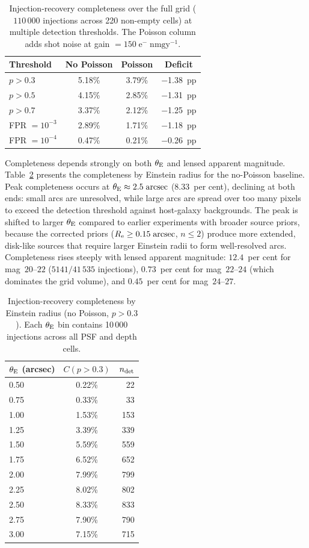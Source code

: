 \documentclass[fleqn,usenatbib]{mnras}
\begin{document}
\begin{table}
\caption{Injection-recovery completeness over the full grid ($110\,000$ injections across 220 non-empty cells) at multiple detection thresholds.  The Poisson column adds shot noise at gain $= 150\;\mathrm{e^{-}\;nmgy^{-1}}$.}
\label{tab:thresholds}
\centering
\begin{tabular}{lccc}
\toprule
Threshold & No Poisson & Poisson & Deficit \\
\midrule
$p > 0.3$ & 5.18\% & 3.79\% & $-$1.38~pp \\
$p > 0.5$ & 4.15\% & 2.85\% & $-$1.31~pp \\
$p > 0.7$ & 3.37\% & 2.12\% & $-$1.25~pp \\
FPR $= 10^{-3}$ & 2.89\% & 1.71\% & $-$1.18~pp \\
FPR $= 10^{-4}$ & 0.47\% & 0.21\% & $-$0.26~pp \\
\bottomrule
\end{tabular}
\end{table}

Completeness depends strongly on both $\theta_{\rm E}$ and lensed apparent magnitude.  Table~\ref{tab:thetaE} presents the completeness by Einstein radius for the no-Poisson baseline.  Peak completeness occurs at $\theta_{\rm E} \approx 2.5\;\mathrm{arcsec}$ ($8.33$~per cent), declining at both ends: small arcs are unresolved, while large arcs are spread over too many pixels to exceed the detection threshold against host-galaxy backgrounds.  The peak is shifted to larger $\theta_{\rm E}$ compared to earlier experiments with broader source priors, because the corrected priors ($R_{\rm e} \geq 0.15\;\mathrm{arcsec}$, $n \leq 2$) produce more extended, disk-like sources that require larger Einstein radii to form well-resolved arcs.  Completeness rises steeply with lensed apparent magnitude: $12.4$~per cent for mag~$20$--$22$ ($5141/41\,535$ injections), $0.73$~per cent for mag~$22$--$24$ (which dominates the grid volume), and $0.45$~per cent for mag~$24$--$27$.

\begin{table}
\caption{Injection-recovery completeness by Einstein radius (no Poisson, $p > 0.3$).  Each $\theta_{\rm E}$ bin contains 10\,000 injections across all PSF and depth cells.}
\label{tab:thetaE}
\centering
\begin{tabular}{lcr}
\toprule
$\theta_{\rm E}$ (arcsec) & $C(p>0.3)$ & $n_{\rm det}$ \\
\midrule
0.50 & 0.22\% & 22 \\
0.75 & 0.33\% & 33 \\
1.00 & 1.53\% & 153 \\
1.25 & 3.39\% & 339 \\
1.50 & 5.59\% & 559 \\
1.75 & 6.52\% & 652 \\
2.00 & 7.99\% & 799 \\
2.25 & 8.02\% & 802 \\
2.50 & 8.33\% & 833 \\
2.75 & 7.90\% & 790 \\
3.00 & 7.15\% & 715 \\
\bottomrule
\end{tabular}
\end{table}
\end{document}
